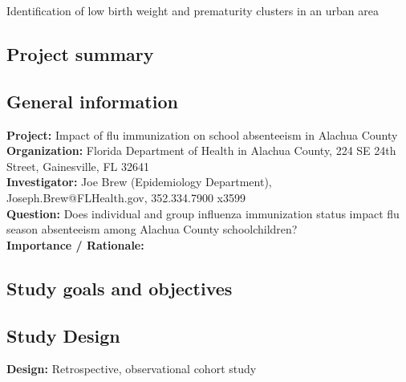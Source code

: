 \documentclass{article}
\begin{document}



\begin{center}
\begin{huge}
Identification of low birth weight and prematurity clusters in an urban area
\end{huge}

\subsection*{Project summary}

\end{center}



\noindent \emph{\blindtext} 


\begin{multicols}{2}


\subsection*{General information}

\noindent \textbf{Project:} Impact of flu immunization on school absenteeism in Alachua County \\

\noindent \textbf{Organization:} Florida Department of Health in Alachua County, 224 SE 24th Street, Gainesville, FL 32641 \\

\noindent \textbf{Investigator:} Joe Brew (Epidemiology Department), Joseph.Brew@FLHealth.gov, 352.334.7900 x3599 \\

\noindent \textbf{Question:} Does individual and group influenza immunization status impact flu season absenteeism among Alachua County schoolchildren? \\

\noindent \textbf{Importance / Rationale:} \blindtext 

\subsection*{Study goals and objectives}

\blindtext

\subsection*{Study Design}
\noindent \textbf{Design:} Retrospective, observational cohort study \\


\end{multicols}
\end{document}
